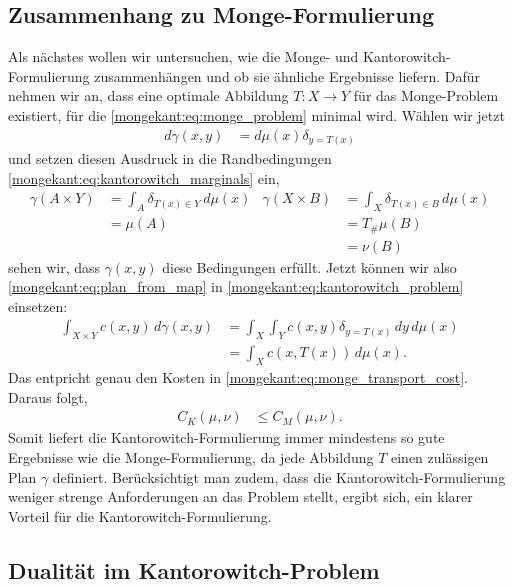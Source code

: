 \subsection{Zusammenhang zu Monge-Formulierung%
\label{mongekant:subsection:monge_kantorowitch_connection}}
Als nächstes wollen wir untersuchen,
wie die Monge- und Kantorowitch-Formulierung zusammenhängen und
ob sie ähnliche Ergebnisse liefern.
Dafür nehmen wir an,
dass eine optimale Abbildung $T\colon X \to Y$ für das Monge-Problem existiert,
für die \eqref{mongekant:eq:monge_problem} minimal wird.
Wählen wir jetzt
\begin{align}
d\gamma(x,y)
&=
d\mu(x) \delta_{y=T(x)}
\label{mongekant:eq:plan_from_map}
\end{align}
und setzen diesen Ausdruck
in die Randbedingungen \eqref{mongekant:eq:kantorowitch_marginals} ein,
\begin{align*}
\gamma(A \times Y)
&=
\int_A \delta_{T(x) \in Y}\, d\mu(x)
&
\gamma(X \times B)
&=
\int_X \delta_{T(x) \in B}\, d\mu(x)
\\
&=
\mu(A)
&&=
T_{\#}\mu\left(B\right)
\\
&&&=
\nu(B)
\end{align*}
sehen wir,
dass $\gamma(x,y)$ diese Bedingungen erfüllt.
Jetzt können wir also \eqref{mongekant:eq:plan_from_map} in
\eqref{mongekant:eq:kantorowitch_problem} einsetzen:
\begin{align*}
\int_{X \times Y} c(x,y)\, d\gamma(x,y)
&=
\int_X \int_Y c(x,y) \delta_{y=T(x)}\, dy\, d\mu(x)
\\
&=
\int_X c(x, T(x))\, d\mu(x)
.
\end{align*}
Das entpricht genau den Kosten in \eqref{mongekant:eq:monge_transport_cost}.
Daraus folgt,
\begin{align*}
C_K(\mu, \nu)
&\leq
C_M(\mu, \nu)
.
\end{align*}
Somit liefert die Kantorowitch-Formulierung immer mindestens so gute Ergebnisse
wie die Monge-Formulierung,
da jede Abbildung $T$ einen zulässigen Plan $\gamma$ definiert.
Berücksichtigt man zudem,
dass die Kantorowitch-Formulierung weniger strenge Anforderungen an das Problem stellt,
ergibt sich,
ein klarer Vorteil für die Kantorowitch-Formulierung.

\subsection{Dualität im Kantorowitch-Problem%
\label{mongekant:subsection:kantorowitch_duality}}

